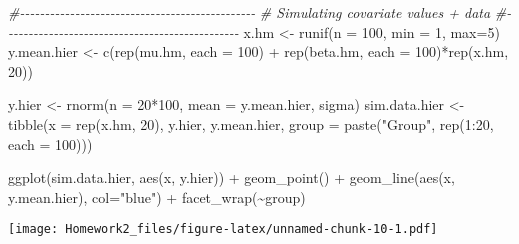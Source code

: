 \documentclass[
]{article}
\newenvironment{Shaded}{\begin{snugshade}}{\end{snugshade}}
\newcommand{\AttributeTok}[1]{\textcolor[rgb]{0.77,0.63,0.00}{#1}}
\newcommand{\CommentTok}[1]{\textcolor[rgb]{0.56,0.35,0.01}{\textit{#1}}}
\newcommand{\DecValTok}[1]{\textcolor[rgb]{0.00,0.00,0.81}{#1}}
\newcommand{\FunctionTok}[1]{\textcolor[rgb]{0.00,0.00,0.00}{#1}}
\newcommand{\NormalTok}[1]{#1}
\newcommand{\OtherTok}[1]{\textcolor[rgb]{0.56,0.35,0.01}{#1}}
\newcommand{\SpecialCharTok}[1]{\textcolor[rgb]{0.00,0.00,0.00}{#1}}
\newcommand{\StringTok}[1]{\textcolor[rgb]{0.31,0.60,0.02}{#1}}
\begin{document}
\begin{Shaded}
\begin{Highlighting}[]
\CommentTok{\#{-}{-}{-}{-}{-}{-}{-}{-}{-}{-}{-}{-}{-}{-}{-}{-}{-}{-}{-}{-}{-}{-}{-}{-}{-}{-}{-}{-}{-}{-}{-}{-}{-}{-}{-}{-}{-}{-}{-}{-}{-}{-}{-}{-}{-}{-}{-}}
\CommentTok{\# Simulating covariate values + data}
\CommentTok{\#{-}{-}{-}{-}{-}{-}{-}{-}{-}{-}{-}{-}{-}{-}{-}{-}{-}{-}{-}{-}{-}{-}{-}{-}{-}{-}{-}{-}{-}{-}{-}{-}{-}{-}{-}{-}{-}{-}{-}{-}{-}{-}{-}{-}{-}{-}{-}}
\NormalTok{x.hm }\OtherTok{\textless{}{-}} \FunctionTok{runif}\NormalTok{(}\AttributeTok{n =} \DecValTok{100}\NormalTok{, }\AttributeTok{min =} \DecValTok{1}\NormalTok{, }\AttributeTok{max=}\DecValTok{5}\NormalTok{)}
\NormalTok{y.mean.hier }\OtherTok{\textless{}{-}} \FunctionTok{c}\NormalTok{(}\FunctionTok{rep}\NormalTok{(mu.hm, }\AttributeTok{each =} \DecValTok{100}\NormalTok{) }\SpecialCharTok{+} 
                   \FunctionTok{rep}\NormalTok{(beta.hm, }\AttributeTok{each =} \DecValTok{100}\NormalTok{)}\SpecialCharTok{*}\FunctionTok{rep}\NormalTok{(x.hm, }\DecValTok{20}\NormalTok{))}

\NormalTok{y.hier }\OtherTok{\textless{}{-}} \FunctionTok{rnorm}\NormalTok{(}\AttributeTok{n =} \DecValTok{20}\SpecialCharTok{*}\DecValTok{100}\NormalTok{, }\AttributeTok{mean =}\NormalTok{ y.mean.hier, sigma)}
\NormalTok{sim.data.hier }\OtherTok{\textless{}{-}} \FunctionTok{tibble}\NormalTok{(}\AttributeTok{x =} \FunctionTok{rep}\NormalTok{(x.hm, }\DecValTok{20}\NormalTok{), }
\NormalTok{                        y.hier, y.mean.hier, }
                        \AttributeTok{group =} \FunctionTok{paste}\NormalTok{(}\StringTok{"Group"}\NormalTok{, }\FunctionTok{rep}\NormalTok{(}\DecValTok{1}\SpecialCharTok{:}\DecValTok{20}\NormalTok{, }\AttributeTok{each =} \DecValTok{100}\NormalTok{)))}

\FunctionTok{ggplot}\NormalTok{(sim.data.hier, }\FunctionTok{aes}\NormalTok{(x, y.hier)) }\SpecialCharTok{+} 
  \FunctionTok{geom\_point}\NormalTok{() }\SpecialCharTok{+} \FunctionTok{geom\_line}\NormalTok{(}\FunctionTok{aes}\NormalTok{(x, y.mean.hier), }\AttributeTok{col=}\StringTok{"blue"}\NormalTok{) }\SpecialCharTok{+} 
  \FunctionTok{facet\_wrap}\NormalTok{(}\SpecialCharTok{\textasciitilde{}}\NormalTok{group)}
\end{Highlighting}
\end{Shaded}

\texttt{[image: Homework2\_files/figure-latex/unnamed-chunk-10-1.pdf]}
\end{document}

